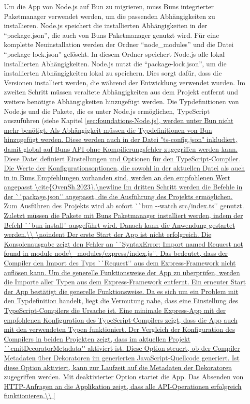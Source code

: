 \noindent
Um die App von Node.js auf Bun zu migrieren, muss Buns integrierter Paketmanager verwendet werden, um die passenden Abhängigkeiten zu installieren. Node.js speichert die installierten Abhängigkeiten in der ``package.json'', die auch von Buns Paketmanager genutzt wird. Für eine komplette Neuinstallation werden der Ordner ``node\_modules'' und die Datei ``package-lock.json'' gelöscht. In diesem Ordner speichert Node.js alle lokal installierten Abhängigkeiten. Node.js nutzt die ``package-lock.json'', um die installierten Abhängigkeiten lokal zu speichern. Dies sorgt dafür, dass die Versionen installiert werden, die während der Entwicklung verwendet wurden. \newline
Im zweiten Schritt müssen veraltete Abhängigkeiten aus dem Projekt entfernt und weitere benötigte Abhängigkeiten hinzugefügt werden. Die Typdefinitionen von Node.js und die Pakete, die es unter Node.js ermöglichen, TypeScript auszuführen (siehe Kapitel \ref{sec:foundations-Node.js), werden unter Bun nicht mehr benötigt. Als Abhängigkeit müssen die Typdefinitionen von Bun hinzugefügt werden. Diese werden auch in der Datei "ts-config.json" inkludiert, damit global auf Buns API ohne Kompilierungsfehler zugegriffen werden kann. Diese Datei definiert Einstellungen und Optionen für den TypeScript-Compiler. Die Werte der Konfigurationsoptionen, die sowohl in der aktuellen Datei als auch in in Buns Empfehlungen vorhanden sind, werden an den empfohlenen Wert angepasst \cite{OvenSh.2023}.\newline 
Im dritten Schritt werden die Befehle in der ``package.json'' angepasst, die die Ausführung des Projekts ermöglichen. Zum Ausführen des Projekts wird ab sofort ``bun --watch src/index.ts'' genutzt. Zuletzt müssen die Pakete mit Buns Paketmanager installiert werden, indem der Befehl ``bun install'' ausgeführt wird. Danach kann die Anwendung gestartet werden.\\

\noindent
Der erste Start der App ist nicht erfolgreich. Die Konsolenausgabe zeigt den Fehler an ``SyntaxError: Import named Request not found in module node\_modules/express/index.js''. Das bedeutet, dass der Compiler den Import des Typs ``Request'' aus dem Express-Framework nicht auflösen kann. Um die generelle Funktionsweise der App zu überprüfen, werden die Importe aller Typen aus dem Express-Framework entfernt. Ein erneuter Start der App bestätigt die generelle Funktionsweise. Da es sich um ein Problem mit den Typdefinition handelt, liegt die Vermutung nahe, dass eine Einstellung des TypeScript-Compilers die Ursache ist. Eine minimale Express-App mit der empfohlenen Konfiguration des TypeScript-Compilers zeigt, dass die App auch mit den verwendeten Typen funktioniert. Der Vergleich der Konfiguration des Compilers in beiden Projekten zeigt, dass im aktuellen Projekt ``emitDecoratorMetadata'' aktiviert ist. Diese Option steuert, ob der Compiler Metadaten über Dekoratoren im generierten JavaScript-Quellcode generiert. Ist diese Option aktiviert, kann zur Laufzeit auf die Metadaten der Dekoratoren zugegriffen werden. Mit deaktivierter Option startet die App. Das Absenden von HTTP-Anfragen an die Applikation zeigt, dass alle API-Operationen erfolgreich funktionieren.\\

}
